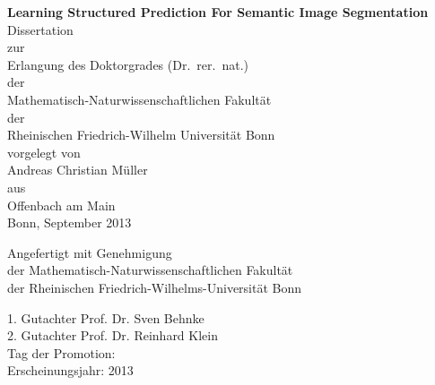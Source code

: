 \documentclass[12pt,toc=bibnumbered, a4paper,twoside,DIV=11]{scrbook}
\begin{document}
\begin{spacing}{1.6}
\begin{titlepage}

\begin{center}
\Large\sffamily
\vspace*{1cm}
\textbf{{\huge Learning Structured Prediction For Semantic Image Segmentation}}\\[5mm]
Dissertation\\%
zur\\%
Erlangung des Doktorgrades (Dr.\ rer.\ nat.)\\%
der\\%
Mathematisch-Naturwissenschaftlichen Fakult\"at\\%
der\\%
Rheinischen Friedrich-Wilhelm Universit\"at Bonn\\%
vorgelegt von\\%
{\LARGE Andreas Christian M\"uller}\\%
aus\\%
Offenbach am Main\\%
Bonn, September 2013
\end{center}
\end{titlepage}
%
\vspace*{5cm}
\Large\sffamily
\begin{center}
Angefertigt mit Genehmigung\\
der Mathematisch-Naturwissenschaftlichen Fakult\"at\\
der Rheinischen Friedrich-Wilhelms-Universit\"at Bonn\\
\end{center}
1. Gutachter Prof. Dr. Sven Behnke\\
2. Gutachter Prof. Dr. Reinhard Klein\\
Tag der Promotion:\\
Erscheinungsjahr: 2013\\
\end{spacing}
\tableofcontents
\end{document}
